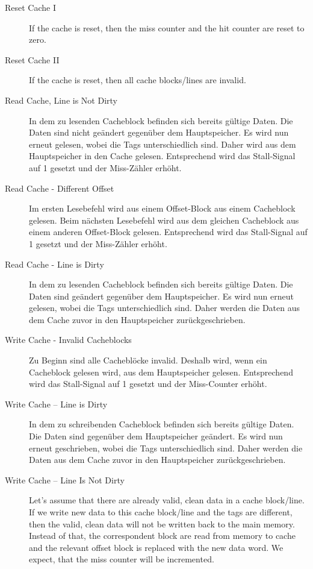 \begin{description}
	\item[Reset Cache I] If the cache is reset, then the miss counter and the hit counter are reset to zero.
	\item[Reset Cache II] If the cache is reset, then all cache blocks/lines are invalid.
	
	\item[Read Cache, Line is Not Dirty] In dem zu lesenden Cacheblock befinden sich bereits gültige Daten. Die Daten sind nicht geändert gegenüber dem Hauptspeicher. Es wird nun erneut gelesen, wobei die Tags unterschiedlich sind. Daher wird aus dem Hauptspeicher in den Cache gelesen. Entsprechend wird das Stall-Signal auf 1 gesetzt und der Miss-Zähler erhöht.
\item[Read Cache - Different Offset] Im ersten Lesebefehl wird aus einem Offset-Block aus einem Cacheblock gelesen. Beim nächsten Lesebefehl wird aus dem gleichen Cacheblock aus einem anderen Offset-Block gelesen. Entsprechend wird das Stall-Signal auf 1 gesetzt und der Miss-Zähler erhöht.
\item[Read Cache - Line is Dirty] In dem zu lesenden Cacheblock befinden sich bereits gültige Daten. Die Daten sind geändert gegenüber dem Hauptspeicher. Es wird nun erneut gelesen, wobei die Tags unterschiedlich sind. Daher werden die Daten aus dem Cache zuvor in den Hauptspeicher zurückgeschrieben.
\item[Write Cache - Invalid Cacheblocks] Zu Beginn sind alle Cacheblöcke invalid. Deshalb wird, wenn ein Cacheblock gelesen wird, aus dem Hauptspeicher gelesen. Entsprechend wird das Stall-Signal auf 1 gesetzt und der Miss-Counter erhöht.
\item[Write Cache – Line is Dirty] In dem zu schreibenden Cacheblock befinden sich bereits gültige Daten. Die Daten sind gegenüber dem Hauptspeicher geändert. Es wird nun erneut geschrieben, wobei die Tags unterschiedlich sind. Daher werden die Daten aus dem Cache zuvor in den Hauptspeicher zurückgeschrieben.
\item[Write Cache – Line Is Not Dirty] Let's assume that there are already valid, clean data in a cache block/line. If we write new data to this cache block/line and the tags are different, then the valid, clean data will not be written back to the main memory. Instead of that, the correspondent block are read from memory to cache and the relevant offset block is replaced with the new data word. We expect, that the miss counter will be incremented.

\end{description}
